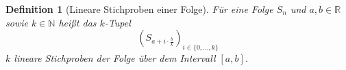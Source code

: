 \documentclass{scrartcl}
\newtheorem{definition}{Definition}
\theoremstyle{definition}
\newtheorem{approximation sequence}{Annäherungsfolge}
\begin{document}
\begin{definition}[Lineare Stichproben einer Folge]
    Für eine Folge \(S_n\) und \(a, b \in \mathbb{R}\) sowie \(k \in
    \mathbb{N}\) heißt das \(k\)-Tupel
    \begin{equation}
        \left(S_{a + i \cdot \frac{b}{k}}\right)_{i \in \{0, \ldots, k\}}
    \end{equation}
    \(k\) lineare Stichproben der Folge über dem Intervall \([a, b]\).
\end{definition}


%
%
%
%
\end{document}
